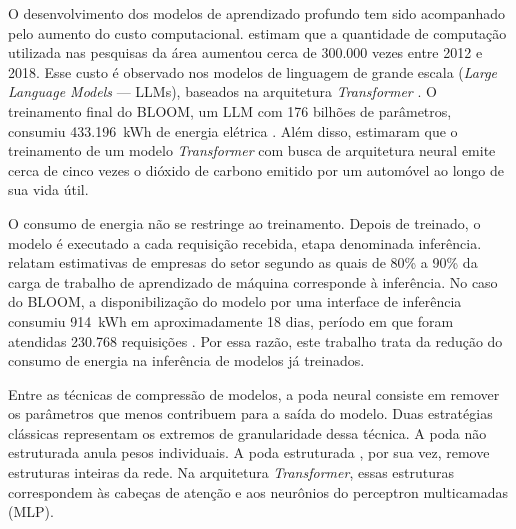 O desenvolvimento dos modelos de aprendizado profundo tem sido acompanhado pelo aumento do
custo computacional.  estimam que a quantidade de computação
utilizada nas pesquisas da área aumentou cerca de 300.000 vezes entre 2012 e 2018. Esse custo
é observado nos modelos de linguagem de grande escala (\textit{Large Language Models} ---
LLMs), baseados na arquitetura \textit{Transformer} \cite{Vaswani2017}. O treinamento final do
BLOOM, um LLM com 176 bilhões de parâmetros, consumiu 433.196~kWh de energia elétrica
\cite{Luccioni2022}. Além disso,  estimaram que o treinamento de um
modelo \textit{Transformer} com busca de arquitetura neural emite cerca de cinco vezes o
dióxido de carbono emitido por um automóvel ao longo de sua vida útil.

O consumo de energia não se restringe ao treinamento. Depois de treinado, o modelo é executado
a cada requisição recebida, etapa denominada inferência.  relatam
estimativas de empresas do setor segundo as quais de 80\% a 90\% da carga de trabalho de
aprendizado de máquina corresponde à inferência. No caso do BLOOM, a disponibilização do
modelo por uma interface de inferência consumiu 914~kWh em aproximadamente 18 dias, período em
que foram atendidas 230.768 requisições \cite{Luccioni2022}. Por essa razão, este trabalho
trata da redução do consumo de energia na inferência de modelos já treinados.

Entre as técnicas de compressão de modelos, a poda neural consiste em remover os parâmetros
que menos contribuem para a saída do modelo. Duas estratégias
clássicas representam os extremos de granularidade dessa técnica. A poda não estruturada
\cite{Han2015} anula pesos individuais. A poda estruturada \cite{Li2017}, por sua vez, remove
estruturas inteiras da rede. Na arquitetura
\textit{Transformer}, essas estruturas correspondem às cabeças de atenção e aos neurônios do
perceptron multicamadas (MLP).

